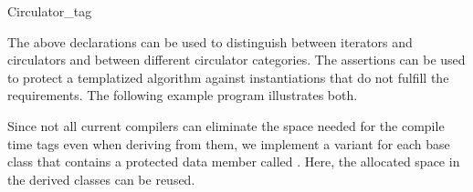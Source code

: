 \begin{ccRefClass}{Circulator_tag}
\ccExample

The above declarations can be used to distinguish between iterators
and circulators and between different circulator categories. The
assertions can be used to protect a templatized algorithm against
instantiations that do not fulfill the requirements. The following
example program illustrates both.


\ccImplementation

Since not all current compilers can eliminate the space needed for the
compile time tags even when deriving from them, we implement a variant
for each base class that contains a protected  data member
called . Here, the allocated space in the derived
classes can be reused.

\ccSetOneOfTwoColumns{8.4cm}
\ccGlue
{} 
\ccGlue
{}

\end{ccRefClass}
